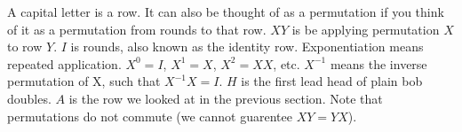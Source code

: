 \documentclass[preview]{standalone}
\begin{document}
\begin{flushleft}
A capital letter is a row. It can also be thought of as a permutation if you think of it as a permutation from rounds to that row. $XY$ is be applying permutation $X$ to row $Y$. $I$ is rounds, also known as the identity row. Exponentiation means repeated application. $X^0=I$, $X^1=X$, $X^2=XX$, etc. $X^{-1}$ means the inverse permutation of X, such that $X^{-1}X=I$. $H$ is the first lead head of plain bob doubles. $A$ is the row we looked at in the previous section. Note that permutations do not commute (we cannot guarentee $XY=YX$).
\end{flushleft}
\end{document}
